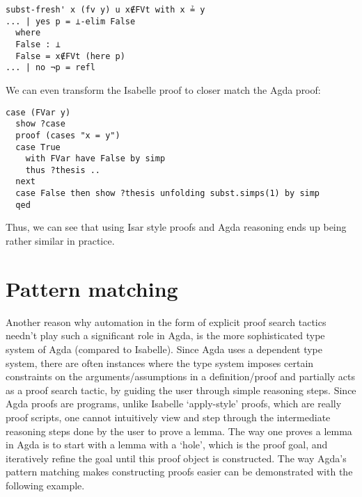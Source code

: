 \documentclass[a4paper, 12pt, twoside]{style/ociamthesis}
\theoremstyle{plain}
\theoremstyle{definition}
\theoremstyle{remark}
\begin{document}
\begin{verbatim}
subst-fresh' x (fv y) u x∉FVt with x ≟ y
... | yes p = ⊥-elim False
  where
  False : ⊥
  False = x∉FVt (here p)
... | no ¬p = refl
\end{verbatim}

We can even transform the Isabelle proof to closer match the Agda proof:

\begin{verbatim}
case (FVar y)
  show ?case
  proof (cases "x = y")
  case True
    with FVar have False by simp
    thus ?thesis ..
  next
  case False then show ?thesis unfolding subst.simps(1) by simp
  qed
\end{verbatim}

Thus, we can see that using Isar style proofs and Agda reasoning ends up
being rather similar in practice.

\section{Pattern matching}\label{pattern-matching}

Another reason why automation in the form of explicit proof search
tactics needn't play such a significant role in Agda, is the more
sophisticated type system of Agda (compared to Isabelle). Since Agda
uses a dependent type system, there are often instances where the type
system imposes certain constraints on the arguments/assumptions in a
definition/proof and partially acts as a proof search tactic, by guiding
the user through simple reasoning steps. Since Agda proofs are programs,
unlike Isabelle `apply-style' proofs, which are really proof scripts,
one cannot intuitively view and step through the intermediate reasoning
steps done by the user to prove a lemma. The way one proves a lemma in
Agda is to start with a lemma with a `hole', which is the proof goal,
and iteratively refine the goal until this proof object is constructed.
The way Agda's pattern matching makes constructing proofs easier can be
demonstrated with the following example.
\end{document}
